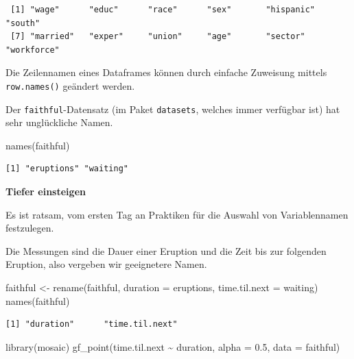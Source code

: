 \documentclass[
  ngerman,
]{scrbook}
\newenvironment{Shaded}{\begin{snugshade}}{\end{snugshade}}
\newcommand{\AttributeTok}[1]{\textcolor[rgb]{0.77,0.63,0.00}{#1}}
\newcommand{\FloatTok}[1]{\textcolor[rgb]{0.00,0.00,0.81}{#1}}
\newcommand{\FunctionTok}[1]{\textcolor[rgb]{0.00,0.00,0.00}{#1}}
\newcommand{\NormalTok}[1]{#1}
\newcommand{\OtherTok}[1]{\textcolor[rgb]{0.56,0.35,0.01}{#1}}
\newcommand{\SpecialCharTok}[1]{\textcolor[rgb]{0.00,0.00,0.00}{#1}}
\newenvironment{tiefereinsteigen}[1]
  {
  \begin{itemize}
  \renewcommand{\labelitemi}{
    \raisebox{2.6\height}[0pt][0pt]{
      {\setkeys{Gin}{width=7em,keepaspectratio}
        {\normalsize \textcolor{dark-fom-green}\faSearch}}
        }
  }
  \begin{blackbox}
         \bgroup\color{dark-fom-green}
          {\textbf{Tiefer einsteigen}}
        \egroup
  \item
  }
  {
  \end{blackbox}
  \end{itemize}
  }
\begin{document}
\begin{verbatim}
 [1] "wage"      "educ"      "race"      "sex"       "hispanic"  "south"    
 [7] "married"   "exper"     "union"     "age"       "sector"    "workforce"
\end{verbatim}

Die Zeilennamen eines Dataframes können durch einfache Zuweisung mittels \texttt{row.names()} geändert werden.

Der \texttt{faithful}-Datensatz (im Paket \texttt{datasets}, welches immer verfügbar ist) hat sehr unglückliche Namen.

\begin{Shaded}
\begin{Highlighting}[]
\FunctionTok{names}\NormalTok{(faithful)}
\end{Highlighting}
\end{Shaded}

\begin{verbatim}
[1] "eruptions" "waiting"  
\end{verbatim}

\begin{tiefereinsteigen}{tiefereinsteigen}
Es ist ratsam, vom ersten Tag an Praktiken für die Auswahl von Variablennamen festzulegen.

\end{tiefereinsteigen}

Die Messungen sind die Dauer einer Eruption und die Zeit bis zur folgenden Eruption, also vergeben wir geeignetere Namen.

\begin{Shaded}
\begin{Highlighting}[]
\NormalTok{faithful }\OtherTok{\textless{}{-}} \FunctionTok{rename}\NormalTok{(faithful,}
                     \AttributeTok{duration =}\NormalTok{ eruptions,}
                     \AttributeTok{time.til.next =}\NormalTok{ waiting)}
\FunctionTok{names}\NormalTok{(faithful)}
\end{Highlighting}
\end{Shaded}

\begin{verbatim}
[1] "duration"      "time.til.next"
\end{verbatim}

\begin{Shaded}
\begin{Highlighting}[]
\FunctionTok{library}\NormalTok{(mosaic)}
\FunctionTok{gf\_point}\NormalTok{(time.til.next }\SpecialCharTok{\textasciitilde{}}\NormalTok{ duration, }\AttributeTok{alpha =} \FloatTok{0.5}\NormalTok{, }\AttributeTok{data =}\NormalTok{ faithful)}
\end{Highlighting}
\end{Shaded}
\end{document}
